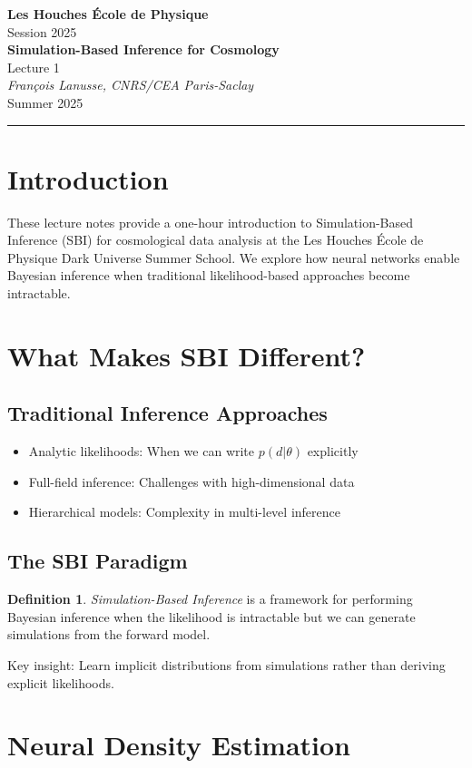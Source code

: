 \documentclass[11pt,a4paper]{article}
\makeatletter
\theoremstyle{definition}
\newtheorem{definition}{Definition}[section]
\newcommand{\lecturetitle}[1]{\def\@lecturetitle{#1}}
\newcommand{\lecturer}[1]{\def\@lecturer{#1}}
\newcommand{\lecturedate}[1]{\def\@lecturedate{#1}}
\newcommand{\lecturenumber}[1]{\def\@lecturenumber{#1}\def\thelecturenumber{#1}}
\renewcommand{\maketitle}{
    \begin{center}
        {\Large\textcolor{leshouches}{\textbf{Les Houches École de Physique}}}\\[0.5em]
        {\large Session 2025}\\[1.5em]
        {\huge\textbf{\@lecturetitle}}\\[0.5em]
        {\large Lecture \@lecturenumber}\\[1em]
        {\large\textit{\@lecturer}}\\[0.5em]
        {\@lecturedate}
    \end{center}
    \vspace{1em}
    \hrule
    \vspace{1.5em}
}
\makeatother
\begin{document}
\lecturetitle{Simulation-Based Inference for Cosmology}
\lecturer{François Lanusse, CNRS/CEA Paris-Saclay}
\lecturedate{Summer 2025}
\lecturenumber{1}

\maketitle

\section{Introduction}

These lecture notes provide a one-hour introduction to Simulation-Based Inference (SBI) for cosmological data analysis at the Les Houches École de Physique Dark Universe Summer School. We explore how neural networks enable Bayesian inference when traditional likelihood-based approaches become intractable.

\section{What Makes SBI Different?}

\subsection{Traditional Inference Approaches}
\begin{itemize}
    \item Analytic likelihoods: When we can write $p(d|\theta)$ explicitly
    \item Full-field inference: Challenges with high-dimensional data
    \item Hierarchical models: Complexity in multi-level inference
\end{itemize}

\subsection{The SBI Paradigm}
\begin{definition}
\emph{Simulation-Based Inference} is a framework for performing Bayesian inference when the likelihood is intractable but we can generate simulations from the forward model.
\end{definition}

Key insight: Learn implicit distributions from simulations rather than deriving explicit likelihoods.

\section{Neural Density Estimation}
\end{document}
